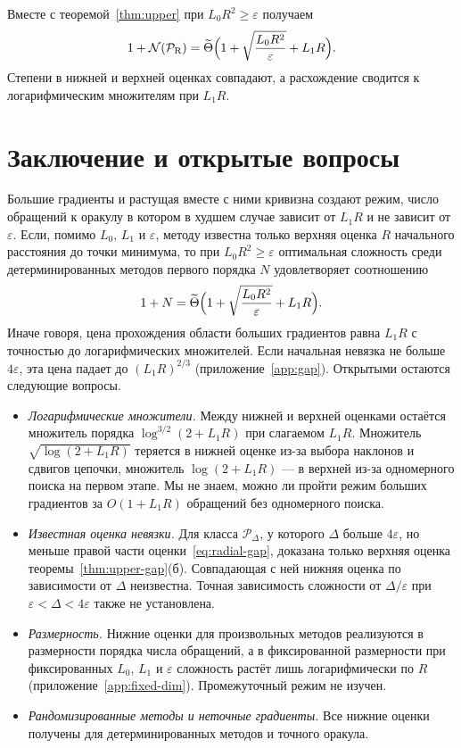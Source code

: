 \documentclass[11pt,a4paper]{article}
\begin{document}
Вместе с теоремой~\ref{thm:upper} при $L_0R^2\ge\varepsilon$ получаем
\[
 1+\mathcal N(\mathcal P_{\rm R})=\widetilde\Theta\Bigl(1+\sqrt{\frac{L_0R^2}\varepsilon}+L_1R\Bigr).
\]
Степени в нижней и верхней оценках совпадают, а расхождение сводится к логарифмическим множителям при $L_1R$.

\section{Заключение и открытые вопросы}\label{sec:conclusion}

Большие градиенты и растущая вместе с ними кривизна создают режим, число обращений к оракулу в котором в худшем случае зависит от $L_1R$ и не зависит от $\varepsilon$. Если, помимо $L_0$, $L_1$ и $\varepsilon$, методу известна только верхняя оценка $R$ начального расстояния до точки минимума, то при $L_0R^2\ge\varepsilon$ оптимальная сложность среди детерминированных методов первого порядка $N$ удовлетворяет соотношению
\[
 1+N=\widetilde\Theta\Bigl(1+\sqrt{\frac{L_0R^2}\varepsilon}+L_1R\Bigr).
\]
Иначе говоря, цена прохождения области больших градиентов равна $L_1R$ с точностью до логарифмических множителей. Если начальная невязка не больше $4\varepsilon$, эта цена падает до $(L_1R)^{2/3}$ (приложение~\ref{app:gap}). Открытыми остаются следующие вопросы.

\begin{itemize}
\item \emph{Логарифмические множители.} Между нижней и верхней оценками остаётся множитель порядка $\log^{3/2}(2+L_1R)$ при слагаемом $L_1R$. Множитель $\sqrt{\log(2+L_1R)}$ теряется в нижней оценке из-за выбора наклонов и сдвигов цепочки, множитель $\log(2+L_1R)$ --- в верхней из-за одномерного поиска на первом этапе. Мы не знаем, можно ли пройти режим больших градиентов за $O(1+L_1R)$ обращений без одномерного поиска.
\item \emph{Известная оценка невязки.} Для класса $\mathcal P_\Delta$, у которого $\Delta$ больше $4\varepsilon$, но меньше правой части оценки~\eqref{eq:radial-gap}, доказана только верхняя оценка теоремы~\ref{thm:upper-gap}(б). Совпадающая с ней нижняя оценка по зависимости от $\Delta$ неизвестна. Точная зависимость сложности от $\Delta/\varepsilon$ при $\varepsilon<\Delta<4\varepsilon$ также не установлена.
\item \emph{Размерность.} Нижние оценки для произвольных методов реализуются в размерности порядка числа обращений, а в фиксированной размерности при фиксированных $L_0$, $L_1$ и $\varepsilon$ сложность растёт лишь логарифмически по $R$ (приложение~\ref{app:fixed-dim}). Промежуточный режим не изучен.
\item \emph{Рандомизированные методы и неточные градиенты.} Все нижние оценки получены для детерминированных методов и точного оракула.
\end{itemize}

\clearpage



\clearpage
\appendix




\end{document}
